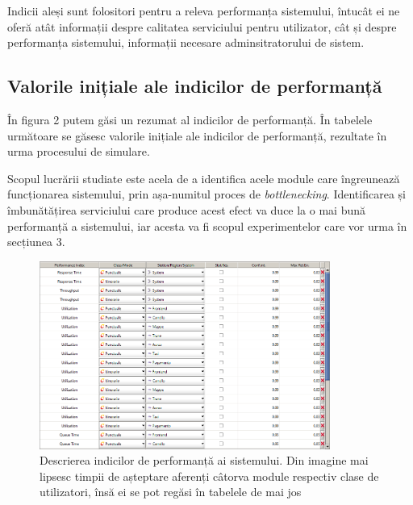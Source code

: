 \documentclass[12pt]{article}
\begin{document}
            Indicii aleși sunt folositori pentru a releva performanța sistemului, întucât ei ne oferă atât informații despre calitatea serviciului pentru utilizator, cât și despre performanța sistemului, informații necesare adminsitratorului de sistem.

        \subsection{Valorile inițiale ale indicilor de performanță}
            În figura 2 putem găsi un rezumat al indicilor de performanță. În tabelele următoare se găsesc valorile inițiale ale indicilor de performanță, rezultate în urma procesului de simulare.

            Scopul lucrării studiate este acela de a identifica acele module care îngreunează funcționarea sistemului, prin așa-numitul proces de \textit{bottlenecking}. Identificarea și îmbunătățirea serviciului care produce acest efect va duce la o mai bună performanță a sistemului, iar acesta va fi scopul experimentelor care vor urma în secțiunea 3.
            \pagebreak

            \begin{figure}[!h]
                \centering
                \includegraphics[width=0.85\textwidth]{images/perf_indices.png}
                \caption{Descrierea indicilor de performanță ai sistemului. Din imagine mai lipsesc timpii de așteptare aferenți câtorva module respectiv clase de utilizatori, însă ei se pot regăsi în tabelele de mai jos}
            \end{figure}
\end{document}
